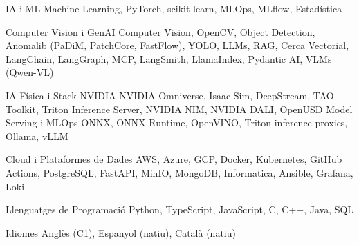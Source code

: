 

\begin{cvskills}

\cvskill
{IA i ML}
{Machine Learning, PyTorch, scikit-learn, MLOps, MLflow, Estadística}

\cvskill
{Computer Vision i GenAI}
{Computer Vision, OpenCV, Object Detection, Anomalib (PaDiM, PatchCore, FastFlow), YOLO, LLMs, RAG, Cerca Vectorial, LangChain, LangGraph, MCP, LangSmith, LlamaIndex, Pydantic AI, VLMs (Qwen-VL)}

\cvskill
{IA Física i Stack NVIDIA}
{NVIDIA Omniverse, Isaac Sim, DeepStream, TAO Toolkit, Triton Inference Server, NVIDIA NIM, NVIDIA DALI, OpenUSD}
\cvskill
{Model Serving i MLOps}
{ONNX, ONNX Runtime, OpenVINO, Triton inference proxies, Ollama, vLLM}


\cvskill
{Cloud i Plataformes de Dades}
{AWS, Azure, GCP, Docker, Kubernetes, GitHub Actions, PostgreSQL, FastAPI, MinIO, MongoDB, Informatica, Ansible, Grafana, Loki}

\cvskill
{Llenguatges de Programació}
{Python, TypeScript, JavaScript, C, C++, Java, SQL}

\cvskill
{Idiomes}
{Anglès (C1), Espanyol (natiu), Català (natiu)}

\end{cvskills}
